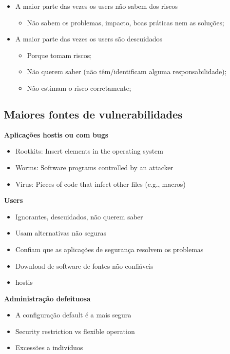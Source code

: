 \documentclass{article}
\begin{document}
\begin{flushleft}
  \begin{flushleft}
    \begin{itemize}
      \item A maior parte das vezes os users não sabem dos riscos
      \begin{itemize}
        \item Não sabem os problemas, impacto, boas práticas nem as soluções;
      \end{itemize}
      \item A maior parte das vezes os users são descuidados
      \begin{itemize}
        \item Porque tomam riscos;
        \item Não querem saber (não têm/identificam alguma responsabilidade);
        \item Não estimam o risco corretamente;
      \end{itemize}
    \end{itemize}
  \end{flushleft}

  \subsection{Maiores fontes de vulnerabilidades}

  \begin{flushleft}
    \textbf{Aplicações hostis ou com bugs}
    \begin{itemize}
      \item Rootkits: Insert elements in the operating system
      \item Worms: Software programs controlled by an attacker
      \item Virus: Pieces of code that infect other files (e.g., macros)
    \end{itemize}

    \textbf{Users}
    \begin{itemize}
      \item Ignorantes, descuidados, não querem saber
      \item Usam alternativas não seguras
      \item Confiam que as aplicações de segurança resolvem os problemas
      \item Download de software de fontes não confiáveis
      \item hostis
    \end{itemize}

    \textbf{Administração defeituosa}
    \begin{itemize}
      \item A configuração default é a mais segura
      \item Security restriction vs flexible operation
      \item Excessões a indivíduos
    \end{itemize}


\end{flushleft}
\end{flushleft}
\end{document}
